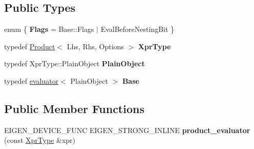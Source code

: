\subsection*{Public Types}
\begin{DoxyCompactItemize}
\item 
\mbox{\label{struct_eigen_1_1internal_1_1product__evaluator_3_01_product_3_01_lhs_00_01_rhs_00_01_options_01_34fdf849c0cc96fc7f8fe25f34362e65_a5f4ba6be4c534fb64a0ee823f57ce58c}} 
enum \{ {\bfseries Flags} = Base\+::Flags $\vert$ Eval\+Before\+Nesting\+Bit
 \}
\item 
\mbox{\label{struct_eigen_1_1internal_1_1product__evaluator_3_01_product_3_01_lhs_00_01_rhs_00_01_options_01_34fdf849c0cc96fc7f8fe25f34362e65_a01d2e2f9974bcb77a319ad270e7df028}} 
typedef \mbox{\hyperlink{class_eigen_1_1_product}{Product}}$<$ Lhs, Rhs, Options $>$ {\bfseries Xpr\+Type}
\item 
\mbox{\label{struct_eigen_1_1internal_1_1product__evaluator_3_01_product_3_01_lhs_00_01_rhs_00_01_options_01_34fdf849c0cc96fc7f8fe25f34362e65_a35da901da8b304b261cc5f1ceaf4cfd2}} 
typedef Xpr\+Type\+::\+Plain\+Object {\bfseries Plain\+Object}
\item 
\mbox{\label{struct_eigen_1_1internal_1_1product__evaluator_3_01_product_3_01_lhs_00_01_rhs_00_01_options_01_34fdf849c0cc96fc7f8fe25f34362e65_a86f956818e20477e806ff80f4ddf3dd7}} 
typedef \mbox{\hyperlink{struct_eigen_1_1internal_1_1evaluator}{evaluator}}$<$ Plain\+Object $>$ {\bfseries Base}
\end{DoxyCompactItemize}
\subsection*{Public Member Functions}
\begin{DoxyCompactItemize}
\item 
\mbox{\label{struct_eigen_1_1internal_1_1product__evaluator_3_01_product_3_01_lhs_00_01_rhs_00_01_options_01_34fdf849c0cc96fc7f8fe25f34362e65_a9c0468882507f8d63b93dbfce83d4c7f}} 
E\+I\+G\+E\+N\+\_\+\+D\+E\+V\+I\+C\+E\+\_\+\+F\+U\+NC E\+I\+G\+E\+N\+\_\+\+S\+T\+R\+O\+N\+G\+\_\+\+I\+N\+L\+I\+NE {\bfseries product\+\_\+evaluator} (const \mbox{\hyperlink{class_eigen_1_1_product}{Xpr\+Type}} \&xpr)
\end{DoxyCompactItemize}
